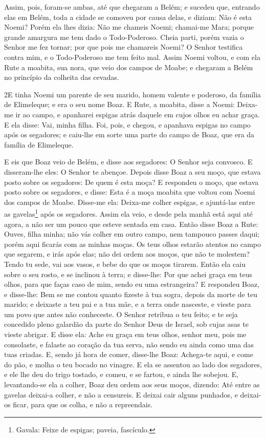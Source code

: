 Assim, pois, foram-se ambas, até que chegaram a Belém; e sucedeu
que, entrando elas em Belém, toda a cidade se comoveu por causa
delas, e diziam: Não é esta Noemi? Porém ela lhes dizia: Não
me chameis Noemi; chamai-me Mara; porque grande amargura me tem dado
o Todo-Poderoso. Cheia parti, porém vazia o Senhor me fez
tornar; por que pois me chamareis Noemi? O Senhor testifica contra
mim, e o Todo-Poderoso me tem feito mal. Assim Noemi voltou,
e com ela Rute a moabita, sua nora, que veio dos campos de Moabe; e
chegaram a Belém no princípio da colheita das cevadas.

\medskip

\lettrine{2} E tinha Noemi um parente de seu marido, homem
valente e poderoso, da família de Elimeleque; e era o seu nome Boaz.
E Rute, a moabita, disse a Noemi: Deixa-me ir ao campo, e
apanharei espigas atrás daquele em cujos olhos eu achar graça. E ela
disse: Vai, minha filha. Foi, pois, e chegou, e apanhava espigas
no campo após os segadores; e caiu-lhe em sorte uma parte do campo
de Boaz, que era da família de Elimeleque.

E eis que Boaz veio de Belém, e disse aos segadores: O Senhor seja
convosco. E disseram-lhe eles: O Senhor te abençoe. Depois disse
Boaz a seu moço, que estava posto sobre os segadores: De quem é esta
moça? E respondeu o moço, que estava posto sobre os segadores, e
disse: Esta é a moça moabita que voltou com Noemi dos campos de
Moabe. Disse-me ela: Deixa-me colher espigas, e ajuntá-las entre
as gavelas\footnote{Gavala: Feixe de espigas; paveia, fascículo. }
após os segadores. Assim ela veio, e desde pela manhã está aqui até
agora, a não ser um pouco que esteve sentada em casa. Então
disse Boaz a Rute: Ouves, filha minha; não vás colher em outro
campo, nem tampouco passes daqui; porém aqui ficarás com as minhas
moças. Os teus olhos estarão atentos no campo que segarem, e
irás após elas; não dei ordem aos moços, que não te molestem? Tendo
tu sede, vai aos vasos, e bebe do que os moços tirarem. Então
ela caiu sobre o seu rosto, e se inclinou à terra; e disse-lhe: Por
que achei graça em teus olhos, para que faças caso de mim, sendo eu
uma estrangeira? E respondeu Boaz, e disse-lhe: Bem se me
contou quanto fizeste à tua sogra, depois da morte de teu marido; e
deixaste a teu pai e a tua mãe, e a terra onde nasceste, e vieste
para um povo que antes não conheceste. O Senhor retribua o
teu feito; e te seja concedido pleno galardão da parte do Senhor
Deus de Israel, sob cujas asas te vieste abrigar. E disse
ela: Ache eu graça em teus olhos, senhor meu, pois me consolaste, e
falaste ao coração da tua serva, não sendo eu ainda como uma das
tuas criadas. E, sendo já hora de comer, disse-lhe Boaz:
Achega-te aqui, e come do pão, e molha o teu bocado no vinagre. E
ela se assentou ao lado dos segadores, e ele lhe deu do trigo
tostado, e comeu, e se fartou, e ainda lhe sobejou. E,
levantando-se ela a colher, Boaz deu ordem aos seus moços, dizendo:
Até entre as gavelas deixai-a colher, e não a censureis. E
deixai cair alguns punhados, e deixai-os ficar, para que os colha, e
não a repreendais.

